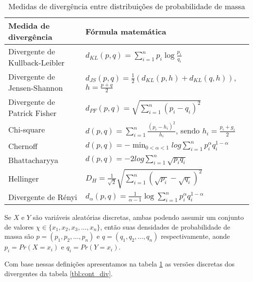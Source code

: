 \begin{table}
\centering
\caption{\label{tbl:divergence}Medidas de divergência entre distribuições de probabilidade de massa}
\begin{tabular}[]{ll}
\hline
Medida de divergência&Fórmula matemática\\
\hline
Divergente de Kullback-Leibler&$d_{KL}(p,q) = \sum\limits_{i = 1}^{n} p_{i}\log{\frac{p_{i}}{q_{i}}}$\\
Divergente de Jensen-Shannon&$d_{JS}(p,q) =\frac{1}{2}(d_{KL}(p,h)+d_{KL}(q,h))$, $h = \frac{p+q}{2}$\\
Divergente de Patrick Fisher&$d_{PF}(p,q) = \sqrt{\sum\limits_{i=1}^{n}{(p_i-q_i)}^2}$\\
Chi-square&$d(p,q)= \sum\limits_{i = 1}^{n}{\frac{(p_{i}-h_{i})^2}{h_{i}}}$, sendo $h_{i} = \frac{p_{i} + g_{i}}{2}$\\
Chernoff&$\displaystyle d(p,q) = - \min_{0<\alpha<1}{log{\sum\limits_{i=1}^{n}{p_i^{\alpha}q_i^{1-\alpha}}}}$\\
Bhattacharyya&$d(p,q) = -2log{\sum\limits_{i = 1}^{n}{\sqrt{p_{i}q_{i}}}}$\\
Hellinger&$D_{H}=\frac{1}{\sqrt{2}}\sqrt{\sum\limits_{i = 1}^{n}{(\sqrt{p_{i}}-\sqrt{q_{i}})^2}}$\\
Divergente de Rényi&$d_{\alpha}(p,q) =\frac{1}{\alpha-1}\log{\sum\limits_{i = 1}^{n}{p_i^{\alpha}q_i^{1-\alpha}}}$\\
\hline
\end{tabular}
\end{table}


Se $X\text{ e }Y$ são variáveis aleatórias discretas, ambas podendo assumir um conjunto de valores $\chi \in \{x_{1},x_{2},x_{3},\ldots,x_{n}\}$, então suas densidades de probabilidade de massa são $p = (p_{1},p_{2},\ldots,p_{n})$ e $q = (q_{1},q_{2},\ldots,q_{n})$ respectivamente, aonde $p_i = Pr(X = x_{i})$ e $q_i = Pr(Y = x_{i})$.    

Com base nessas definições apresentamos na tabela \ref{tbl:divergence} as versões discretas dos divergentes da tabela \ref{tbl:cont_div}.

\begin{comment}
From Sample Similarity to Ensemble
Similarity: Probabilistic Distance Measures
in Reproducing Kernel Hilbert Space


Probabilistic distance measures find use in many research
areas such as probability and statistics, pattern recognition,
information theory, communication, and so on. In statistics,
the probabilistic distances are often used in asymptotic
analysis. In pattern recognition, pattern separability is
usually evaluated using probabilistic distance measures [1],
[2] such as Chernoff or Bhattacharyya distances because they
provide bounds for the probability of error. 
\end{comment}


